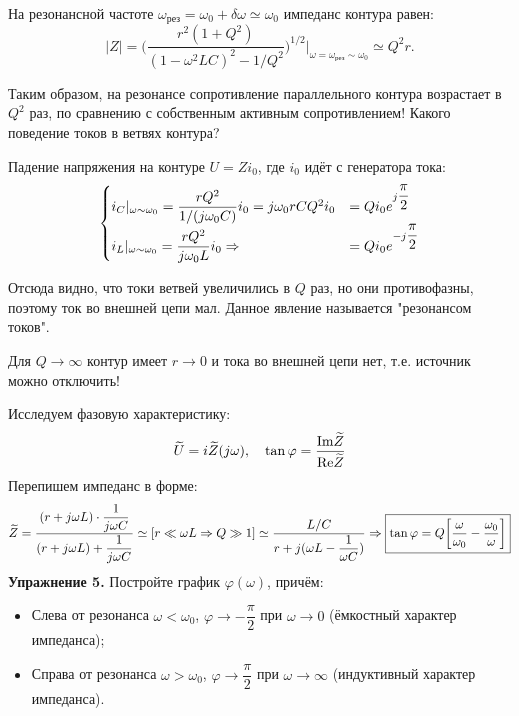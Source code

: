 \documentclass[../main/main.tex]{subfiles}
\begin{document}
На резонансной частоте $\omega_{\text{рез}} = \omega_0 + \delta \omega \simeq \omega_0$ импеданс контура равен:
$$|Z| = \bigg( \dfrac{r^2 (1 + Q^2)}{(1 - \omega^2 LC)^2 - 1/Q^2} \bigg)^{1/2} \bigg|_{\omega=\omega_{\text{рез}} \sim \omega_0} \simeq Q^2 r.$$

Таким образом, на резонансе сопротивление параллельного контура возрастает в $Q^2$ раз, по сравнению с собственным активным сопротивлением! Какого поведение токов в ветвях контура?

Падение напряжения на контуре $U = Z i_0$, где $i_0$ идёт с генератора тока:
\begin{equation*}
 \begin{cases}
   i_C |_{\omega \sim \omega_0} = \dfrac{r Q^2}{1/(j\omega_0 C)} i_0 = j\omega_0 rC Q^2 i_0 &= Q i_0 e^{j \dfrac{\pi}{2}} \\ 
   i_L |_{\omega \sim \omega_0} = \dfrac{r Q^2}{j\omega_0 L} i_0 \Rightarrow &= Q i_0 e^{-j \dfrac{\pi}{2}}
 \end{cases}
\end{equation*}

Отсюда видно, что токи ветвей увеличились в $Q$ раз, но они противофазны, поэтому ток во внешней цепи мал. Данное явление называется "резонансом токов".

Для $Q \rightarrow \infty$  контур имеет $r\rightarrow 0$ и тока во внешней цепи нет, т.е. источник можно отключить! %

Исследуем фазовую характеристику: 
$$\widetilde{U} = i \widetilde{Z}(j\omega), \quad \tan\varphi = \dfrac{\text{Im} \widetilde{Z}}{\text{Re}\widetilde{Z}}$$
Перепишем импеданс в форме:
$$\widetilde{Z} = \dfrac{(r + j\omega L) \cdot \dfrac{1}{j\omega C}}{(r + j\omega L) + \dfrac{1}{j\omega C}} \simeq [r \ll \omega L \Rightarrow Q \gg 1] \simeq \dfrac{L/C}{r + j(\omega L - \dfrac{1}{\omega C})} \Rightarrow \boxed{\tan \varphi = Q \bigg[ \dfrac{\omega}{\omega_0} - \dfrac{\omega_0}{\omega}\bigg]}$$
\textbf{Упражнение 5.} Постройте график $\varphi(\omega)$, причём:
\begin{itemize}
\item Слева от резонанса $\omega < \omega_0$, $\varphi \rightarrow -\dfrac{\pi}{2}$ при $\omega \rightarrow 0$ (ёмкостный характер импеданса);

\item Справа от резонанса $\omega > \omega_0$, $\varphi \rightarrow \dfrac{\pi}{2}$ при $\omega \rightarrow \infty$ (индуктивный характер импеданса).
\end{itemize}
\end{document}
